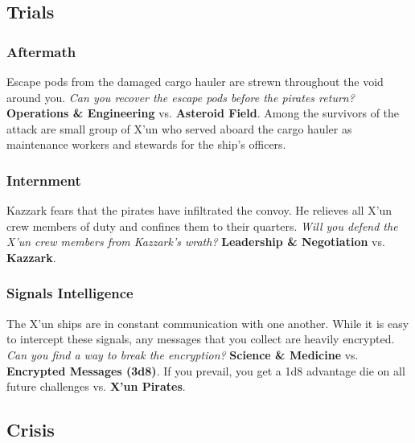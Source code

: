 \documentclass[11pt, a5paper, parskip=half-, DIV=12]{scrartcl}
\begin{document}
\newpage

\subsection*{Trials}

\subsubsection*{Aftermath}
Escape pods from the damaged cargo hauler are strewn throughout the void around you. \textit{Can you recover the escape pods before the pirates return?} \textbf{Operations \& Engineering} vs. \textbf{Asteroid Field}. Among the survivors of the attack are small group of X'un who served aboard the cargo hauler as maintenance workers and stewards for the ship's officers.

\subsubsection*{Internment}
Kazzark fears that the pirates have infiltrated the convoy. He relieves all X'un crew members of duty and confines them to their quarters. \textit{Will you defend the X'un crew members from Kazzark's wrath?} \textbf{Leadership \& Negotiation} vs. \textbf{Kazzark}.

\subsubsection*{Signals Intelligence}
The X'un ships are in constant communication with one another. While it is easy to intercept these signals, any messages that you collect are heavily encrypted. \textit{Can you find a way to break the encryption?} \textbf{Science \& Medicine} vs. \textbf{Encrypted Messages (3d8)}. If you prevail, you get a 1d8 advantage die on all future challenges vs. \textbf{X'un Pirates}.

\subsection*{Crisis}
\end{document}
